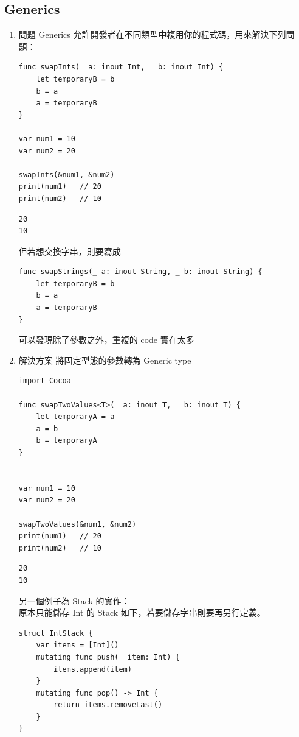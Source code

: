\documentclass[a4paper,12pt]{article}
\begin{document}
\subsection{Generics}
\label{sec:org26fda2f}
\begin{enumerate}
\item 問題
\label{sec:org861904d}
Generics 允許開發者在不同類型中複用你的程式碼，用來解決下列問題：\\
\lstset{breaklines=true,language=swift,label= ,caption= ,captionpos=b,firstnumber=1,numbers=left}
\begin{lstlisting}
func swapInts(_ a: inout Int, _ b: inout Int) {
    let temporaryB = b
    b = a
    a = temporaryB
}

var num1 = 10
var num2 = 20

swapInts(&num1, &num2)
print(num1)   // 20
print(num2)   // 10
\end{lstlisting}

\begin{verbatim}
20
10
\end{verbatim}


但若想交換字串，則要寫成\\
\lstset{breaklines=true,language=swift,label= ,caption= ,captionpos=b,firstnumber=1,numbers=left}
\begin{lstlisting}
func swapStrings(_ a: inout String, _ b: inout String) {
    let temporaryB = b
    b = a
    a = temporaryB
}
\end{lstlisting}

可以發現除了參數之外，重複的 code 實在太多\\
\item 解決方案
\label{sec:orgbc0e32e}
將固定型態的參數轉為 Generic type\\
\lstset{breaklines=true,language=swift,label= ,caption= ,captionpos=b,firstnumber=1,numbers=left}
\begin{lstlisting}
import Cocoa

func swapTwoValues<T>(_ a: inout T, _ b: inout T) {
    let temporaryA = a
    a = b
    b = temporaryA
}


var num1 = 10
var num2 = 20

swapTwoValues(&num1, &num2)
print(num1)   // 20
print(num2)   // 10
\end{lstlisting}

\begin{verbatim}
20
10
\end{verbatim}


另一個例子為 Stack 的實作：\\
原本只能儲存 Int 的 Stack 如下，若要儲存字串則要再另行定義。\\
\lstset{breaklines=true,language=swift,label= ,caption= ,captionpos=b,firstnumber=1,numbers=left}
\begin{lstlisting}
struct IntStack {
    var items = [Int]()
    mutating func push(_ item: Int) {
        items.append(item)
    }
    mutating func pop() -> Int {
        return items.removeLast()
    }
}
\end{lstlisting}


\end{enumerate}
\end{document}

